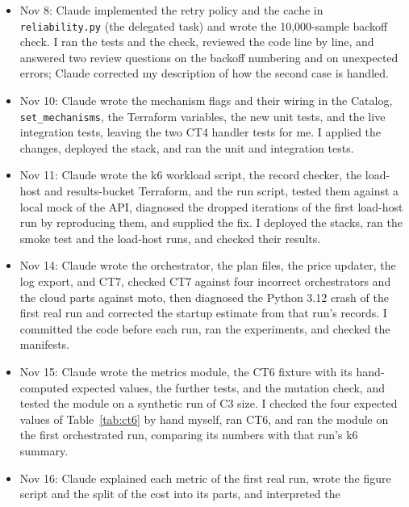 \documentclass[10pt]{article}
\begin{document}
\begin{itemize}
  explained the fake-clock technique on a separate example, and wrote the test
  helpers and the first CT3 test. I chose the two open details of the
  specification and wrote the other eight tests. Claude's review ran them
  against four deliberately wrong implementations, found two gaps, and supplied
  the fixes, which I reviewed and applied.
  \item Nov 8: Claude implemented the retry policy and the cache in
  \texttt{reliability.py} (the delegated task) and wrote the 10{,}000-sample
  backoff check. I ran the tests and the check, reviewed the code line by line,
  and answered two review questions on the backoff numbering and on unexpected
  errors; Claude corrected my description of how the second case is handled.
  \item Nov 10: Claude wrote the mechanism flags and their wiring in the
  Catalog, \texttt{set\_mechanisms}, the Terraform variables, the new unit
  tests, and the live integration tests, leaving the two CT4 handler tests for
  me. I applied the changes, deployed the stack, and ran the unit and
  integration tests.
  \item Nov 11: Claude wrote the k6 workload script, the record checker, the
  load-host and results-bucket Terraform, and the run script, tested them
  against a local mock of the API, diagnosed the dropped iterations of the
  first load-host run by reproducing them, and supplied the fix. I deployed
  the stacks, ran the smoke test and the load-host runs, and checked their
  results.
  \item Nov 14: Claude wrote the orchestrator, the plan files, the price
  updater, the log export, and CT7, checked CT7 against four incorrect
  orchestrators and the cloud parts against moto, then diagnosed the
  Python 3.12 crash of the first real run and corrected the startup estimate
  from that run's records. I committed the code before each run, ran the
  experiments, and checked the manifests.
  \item Nov 15: Claude wrote the metrics module, the CT6 fixture with its
  hand-computed expected values, the further tests, and the mutation check, and
  tested the module on a synthetic run of C3 size. I checked the four expected
  values of Table~\ref{tab:ct6} by hand myself, ran CT6, and ran the module on
  the first orchestrated run, comparing its numbers with that run's k6
  summary.
  \item Nov 16: Claude explained each metric of the first real run, wrote the
  figure script and the split of the cost into its parts, and interpreted the

\end{itemize}
\end{document}
